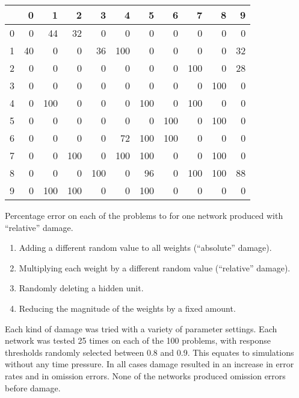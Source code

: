 \begin{fancytable}
\begin{center}
\begin{tabular}{r|rrrrrrrrrr}
&
      0 &   1 &   2 &   3 &   4 &   5 &   6 &   7 &   8 &   9\\
\hline
0 &   0 &  44 &  32 &   0 &   0 &   0 &   0 &   0 &   0 &   0\\
1 &  40 &   0 &   0 &  36 & 100 &   0 &   0 &   0 &   0 &  32\\
2 &   0 &   0 &   0 &   0 &   0 &   0 &   0 & 100 &   0 &  28\\
3 &   0 &   0 &   0 &   0 &   0 &   0 &   0 &   0 & 100 &   0\\
4 &   0 & 100 &   0 &   0 &   0 & 100 &   0 & 100 &   0 &   0\\
5 &   0 &   0 &   0 &   0 &   0 &   0 & 100 &   0 & 100 &   0\\
6 &   0 &   0 &   0 &   0 &  72 & 100 & 100 &   0 &   0 &   0\\
7 &   0 &   0 & 100 &   0 & 100 & 100 &   0 &   0 & 100 &   0\\
8 &   0 &   0 &   0 & 100 &   0 &  96 &   0 & 100 & 100 &  88\\
9 &   0 & 100 & 100 &   0 &   0 & 100 &   0 &   0 &   0 &   0\\
\end{tabular}
\end{center}
\caption{Percentage error on each of the problems  to  for one
network produced with ``relative'' damage.}
\label{f:reldam}
\end{fancytable}



\begin{enumerate}

\item Adding a different random value to all weights
(``absolute'' damage).

\item Multiplying each weight by a different random value (``relative''
damage).

\item Randomly deleting a hidden unit.

\item Reducing the magnitude of the weights by a fixed amount.
\end{enumerate}

Each kind of damage was tried with a variety of parameter settings.
Each network was tested 25 times on each of the 100
problems, with response thresholds randomly selected between 0.8 and 0.9.
This equates to simulations without any time pressure. In all cases damage
resulted in an increase in error rates and in omission errors. None of the
networks produced omission errors before damage.

